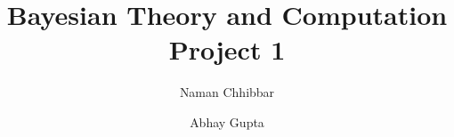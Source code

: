 \documentclass{beamer}
\title{Bayesian Theory and Computation\\Project 1}
\author[Naman Chhibbar \\ Abhay Gupta]{
  Naman Chhibbar \and
  Abhay Gupta
}
\institute{Indian Institute of Technology Hyderabad}
\begin{document}
  \begin{frame}
    \titlepage
  \end{frame}

  
\end{document}
